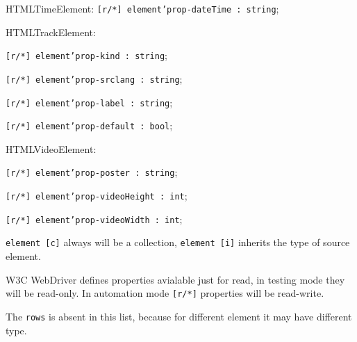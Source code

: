 \begin{icItems}
	\item HTMLTimeElement: \texttt{[r/*] element'prop-dateTime : string};
	
	\item HTMLTrackElement:
	\begin{icItems}
		\item \texttt{[r/*] element'prop-kind : string};
		\item \texttt{[r/*] element'prop-srclang : string};
		\item \texttt{[r/*] element'prop-label : string};
		\item \texttt{[r/*] element'prop-default : bool};
	\end{icItems}
	
	\item HTMLVideoElement:
	\begin{icItems}
		\item \texttt{[r/*] element'prop-poster : string};
		\item \texttt{[r/*] element'prop-videoHeight : int};
		\item \texttt{[r/*] element'prop-videoWidth : int};
	\end{icItems}
	
\end{icItems}

\texttt{element [c]} always will be a collection, \texttt{element [i]} inherits the type of source element.

W3C WebDriver defines properties avialable just for read, in testing mode they will be read-only. In automation mode \texttt{[r/*]} properties will be read-write.

The \texttt{rows} is absent in this list, because for different element it may have different type.
